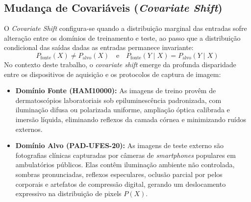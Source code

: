 \documentclass[oneside,english,brazilian]{UNISINOSmonografia}
\begin{document}
\subsection{Mudança de Covariáveis (\textit{Covariate Shift})}
O \textit{Covariate Shift} configura-se quando a distribuição marginal das entradas sofre alteração entre os domínios de treinamento e teste, ao passo que a distribuição condicional das saídas dadas as entradas permanece invariante:
\begin{equation}
    P_{\text{fonte}}(X) \neq P_{\text{alvo}}(X) \quad \text{e} \quad P_{\text{fonte}}(Y \mid X) = P_{\text{alvo}}(Y \mid X)
\end{equation}
No contexto deste trabalho, o \textit{covariate shift} emerge da profunda disparidade entre os dispositivos de aquisição e os protocolos de captura de imagem:
\begin{itemize}
    \item \textbf{Domínio Fonte (HAM10000):} As imagens de treino provêm de dermatoscópios laboratoriais sob epiluminescência padronizada, com iluminação difusa ou polarizada uniforme, ampliação óptica calibrada e imersão líquida, eliminando reflexos da camada córnea e minimizando ruídos externos.
    \item \textbf{Domínio Alvo (PAD-UFES-20):} As imagens de teste externo são fotografias clínicas capturadas por câmeras de \textit{smartphones} populares em ambulatórios públicos. Elas contêm iluminação ambiente não controlada, sombras pronunciadas, reflexos especulares, oclusão parcial por pelos corporais e artefatos de compressão digital, gerando um deslocamento expressivo na distribuição de pixels $P(X)$.
\end{itemize}
\end{document}
